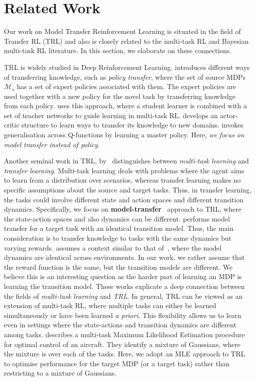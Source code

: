 \section{Related Work}\label{sec:related}
Our work on Model Transfer Reinforcement Learning is situated in the field of Transfer RL (TRL) and also is closely related to the multi-task RL and Bayesian multi-task RL literature. In this section, we elaborate on these connections.

TRL is widely studied in Deep Reinforcement Learning. \citep{zhu2023transfer} introduces different ways of transferring knowledge, such as \emph{policy transfer}, where the set of source MDPs $\mathcal{M}_s$ has a set of expert policies associated with them. The expert policies are used together with a new policy for the novel task by transferring knowledge from each policy. \citep{rusu2015policy} uses this approach, where a student learner is combined with a set of teacher networks to guide learning in multi-task RL. \citep{parisotto2015actor} develops an actor-critic structure to learn ways to transfer its knowledge to new domains.   \citep{arnekvist2019vpe} invokes generalisation across Q-functions by learning a master policy. Here,\textit{ we focus on model transfer instead of policy}.

Another seminal work in TRL, by~\citep{taylor2009transfer} distinguishes between \emph{multi-task learning} and \emph{transfer learning}. Multi-task learning deals with problems where the agent aims to learn from a distribution over scenarios, whereas transfer learning makes no specific assumptions about the source and target tasks. Thus, in transfer learning, the tasks could involve different state and action spaces and different transition dynamics. Specifically, we focus on \textbf{model-transfer}~\citep{atkeson1997comparison} approach to TRL, where the state-action spaces and also dynamics can be different. \citep{atkeson1997comparison} performs model transfer for a target task with an identical transition model. Thus, the main consideration is to transfer knowledge to tasks with the same dynamics but varying rewards. \citep{laroche2017transfer} assumes a context similar to that of~\citep{atkeson1997comparison}, where the model dynamics are identical across environments. In our work, we rather assume that the reward function is the same, but the transition models are different. We believe this is an interesting question as the harder part of learning an MDP is learning the transition model. 
These works explicate a deep connection between the fields of \emph{multi-task learning} and \emph{TRL}. In general, TRL can be viewed as an extension of multi-task RL, where multiple tasks can either be learned simultaneously or have been learned \textit{a priori}. This flexibility allows us to learn even in settings where the state-actions and transition dynamics are different among tasks. \citep{rommel2017aircraft} describes a multi-task Maximum Likelihood Estimation procedure for optimal control of an aircraft. They identify a mixture of Gaussians, where the mixture is over each of the tasks. Here, we adopt an MLE approach to TRL to optimise performance for the target MDP (or a target task) rather than restricting to a mixture of Gaussians.

